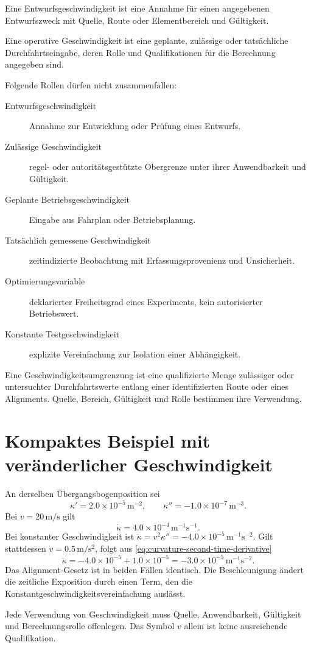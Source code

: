\begin{definition}[Entwurfsgeschwindigkeit]
\label{def:design-velocity}
Eine Entwurfsgeschwindigkeit ist eine Annahme für einen angegebenen
Entwurfszweck mit Quelle, Route oder Elementbereich und Gültigkeit.
\end{definition}

\begin{definition}
\label{def:operational-velocity}
Eine operative Geschwindigkeit ist eine geplante, zulässige oder tatsächliche
Durchfahrtseingabe, deren Rolle und Qualifikationen für die Berechnung
angegeben sind.
\end{definition}

Folgende Rollen dürfen nicht zusammenfallen:
\begin{description}
\item[Entwurfsgeschwindigkeit] Annahme zur Entwicklung oder Prüfung eines
Entwurfs.
\item[Zulässige Geschwindigkeit] regel- oder autoritätsgestützte Obergrenze
unter ihrer Anwendbarkeit und Gültigkeit.
\item[Geplante Betriebsgeschwindigkeit] Eingabe aus Fahrplan oder
Betriebsplanung.
\item[Tatsächlich gemessene Geschwindigkeit] zeitindizierte Beobachtung mit
Erfassungsprovenienz und Unsicherheit.
\item[Optimierungsvariable] deklarierter Freiheitsgrad eines Experiments,
kein autorisierter Betriebswert.
\item[Konstante Testgeschwindigkeit] explizite Vereinfachung zur Isolation
einer Abhängigkeit.
\end{description}

\begin{definition}[Geschwindigkeitsumgrenzung]
\label{def:velocity-envelope}
Eine Geschwindigkeitsumgrenzung ist eine qualifizierte Menge zulässiger oder
untersuchter Durchfahrtswerte entlang einer identifizierten Route oder eines
Alignments. Quelle, Bereich, Gültigkeit und Rolle bestimmen ihre Verwendung.
\end{definition}

\section{Kompaktes Beispiel mit veränderlicher Geschwindigkeit}

An derselben Übergangsbogenposition sei
\[
\kappa'=2.0\times10^{-5}\,\mathrm{m^{-2}},
\qquad
\kappa''=-1.0\times10^{-7}\,\mathrm{m^{-3}}.
\]
Bei \(v=20\,\mathrm{m/s}\) gilt
\[
\dot\kappa=4.0\times10^{-4}\,\mathrm{m^{-1}s^{-1}}.
\]
Bei konstanter Geschwindigkeit ist
\(\ddot\kappa=v^2\kappa''=-4.0\times10^{-5}\,
\mathrm{m^{-1}s^{-2}}\). Gilt stattdessen
\(\dot v=0.5\,\mathrm{m/s^2}\), folgt aus
\cref{eq:curvature-second-time-derivative}
\[
\ddot\kappa
=-4.0\times10^{-5}+1.0\times10^{-5}
=-3.0\times10^{-5}\,\mathrm{m^{-1}s^{-2}}.
\]
Das Alignment-Gesetz ist in beiden Fällen identisch. Die Beschleunigung ändert
die zeitliche Exposition durch einen Term, den die
Konstantgeschwindigkeitsvereinfachung auslässt.

\begin{summary}
Jede Verwendung von Geschwindigkeit muss Quelle, Anwendbarkeit, Gültigkeit
und Berechnungsrolle offenlegen. Das Symbol \(v\) allein ist keine
ausreichende Qualifikation.
\end{summary}
